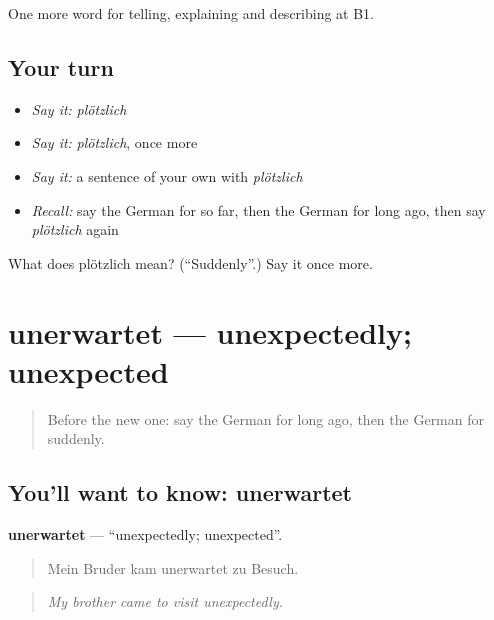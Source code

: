 \begin{grammarlens}[title={What you've built}]
One more word for telling, explaining and describing at B1.
\end{grammarlens}

\subsection*{Your turn}
\begin{itemize}
\raggedright
  \item \emph{Say it:} \emph{plötzlich}
  \item \emph{Say it:} \emph{plötzlich}, once more
  \item \emph{Say it:} a sentence of your own with \emph{plötzlich}
  \item \emph{Recall:} say the German for so far, then the German for long ago, then say \emph{plötzlich} again
\end{itemize}

\begin{tcolorbox}[breakable,colback=teal!4,colframe=teal!35!black,title={Before you move on}]
What does plötzlich mean? (\textquotedblleft{}Suddenly\textquotedblright{}.) Say it once more.
\end{tcolorbox}
\section[unerwartet]{unerwartet — unexpectedly; unexpected}

\label{lesson:GE-C266-unerwartet}



\begin{quote}
Before the new one: say the German for long ago, then the German for suddenly.
\end{quote}

\subsection*{You'll want to know: unerwartet}
\textbf{unerwartet} — \textquotedblleft{}unexpectedly; unexpected\textquotedblright{}.

\begin{quote}
Mein Bruder kam unerwartet zu Besuch.
\end{quote}

\begin{quote}
\emph{My brother came to visit unexpectedly.}
\end{quote}

